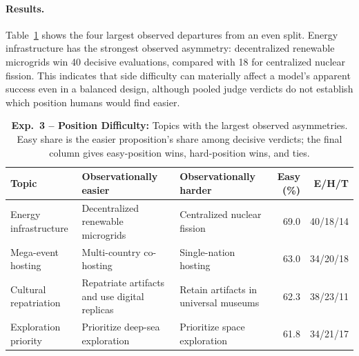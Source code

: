 \documentclass{article}
\begin{document}
\paragraph{Results.}
Table~\ref{tab:current-position-difficulty} shows the four largest observed departures from an even split. Energy infrastructure has the strongest observed asymmetry: decentralized renewable microgrids win 40 decisive evaluations, compared with 18 for centralized nuclear fission. This indicates that side difficulty can materially affect a model's apparent success even in a balanced design, although pooled judge verdicts do not establish which position humans would find easier.

\begin{table}[H]
  \centering
  \footnotesize
  \caption{\textbf{Exp.~3 -- Position Difficulty:} Topics with the largest observed asymmetries. Easy share is the easier proposition's share among decisive verdicts; the final column gives easy-position wins, hard-position wins, and ties.}
  \label{tab:current-position-difficulty}
  \begin{tabularx}{\textwidth}{@{}>{\raggedright\arraybackslash}p{}>{\raggedright\arraybackslash}X>{\raggedright\arraybackslash}Xrr@{}}
    \toprule
    Topic & Observationally easier & Observationally harder & Easy (\%) & E/H/T \\
    \midrule
    Energy infrastructure & Decentralized renewable microgrids & Centralized nuclear fission & 69.0 & 40/18/14 \\
    Mega-event hosting & Multi-country co-hosting & Single-nation hosting & 63.0 & 34/20/18 \\
    Cultural repatriation & Repatriate artifacts and use digital replicas & Retain artifacts in universal museums & 62.3 & 38/23/11 \\
    Exploration priority & Prioritize deep-sea exploration & Prioritize space exploration & 61.8 & 34/21/17 \\
    \bottomrule
  \end{tabularx}
\end{table}
\end{document}
